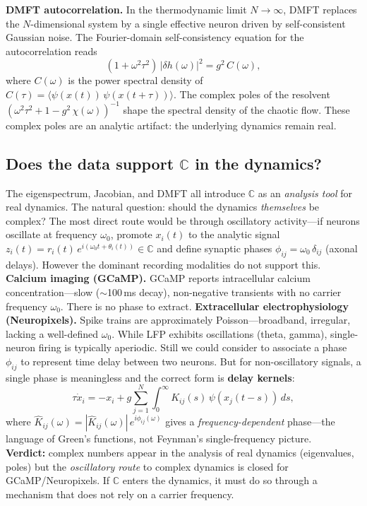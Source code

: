 \documentclass[11pt,a4paper]{article}
\newcommand{\C}{\mathbb{C}}
\begin{document}
{\\
\\
\textbf{DMFT autocorrelation.}
In the thermodynamic limit $N \to \infty$, DMFT replaces the $N$-dimensional system by a single effective neuron driven by self-consistent Gaussian noise. The Fourier-domain self-consistency equation for the autocorrelation reads
\begin{equation}
(1 + \omega^2\tau^2)\,|\delta h(\omega)|^2 = g^2\,C(\omega),
\label{eq:dmft}
\end{equation}
where $C(\omega)$ is the power spectral density of $C(\tau) = \langle \psi(x(t))\,\psi(x(t+\tau))\rangle$. The complex poles of the resolvent $(\omega^2\tau^2 + 1 - g^2\,\chi(\omega))^{-1}$ shape the spectral density of the chaotic flow. These complex poles are an analytic artifact: the underlying dynamics remain real.

\subsection{Does the data support $\C$ in the dynamics?}
\label{sec:data_problem}

The eigenspectrum, Jacobian, and DMFT all introduce $\C$ as an \emph{analysis tool} for real dynamics. The natural question: should the dynamics \emph{themselves} be complex? The most direct route would be through oscillatory activity---if neurons oscillate at frequency $\omega_0$, promote $x_i(t)$ to the analytic signal $z_i(t) = r_i(t)\,e^{i(\omega_0 t + \theta_i(t))} \in \C$ and define synaptic phases $\phi_{ij} = \omega_0\,\delta_{ij}$ (axonal delays). However the dominant recording modalities do not support this. \textbf{Calcium imaging (GCaMP).} GCaMP reports intracellular calcium concentration---slow ($\sim$100\,ms decay), non-negative transients with no carrier frequency $\omega_0$. There is no phase to extract. \textbf{Extracellular electrophysiology (Neuropixels).} Spike trains are approximately Poisson---broadband, irregular, lacking a well-defined $\omega_0$. While LFP exhibits oscillations (theta, gamma), single-neuron firing is typically aperiodic. Still we could consider to associate a phase $\phi_{ij}$ to represent time delay between two neurons. But for non-oscillatory signals, a single phase is meaningless and the correct form is \textbf{delay kernels}:
\begin{equation}
\tau\dot{x}_i = -x_i + g\sum_{j=1}^{N} \int_0^\infty K_{ij}(s)\,\psi(x_j(t-s))\,ds,
\label{eq:delay_kernel}
\end{equation}
where $\hat{K}_{ij}(\omega) = |\hat{K}_{ij}(\omega)|\,e^{i\phi_{ij}(\omega)}$ gives a \emph{frequency-dependent} phase---the language of Green's functions, not Feynman's single-frequency picture.
\\
\textbf{Verdict:} complex numbers appear in the analysis of real dynamics (eigenvalues, poles) but the \emph{oscillatory route} to complex dynamics is closed for GCaMP/Neuropixels. If $\C$ enters the dynamics, it must do so through a mechanism that does not rely on a carrier frequency.


}
\end{document}
